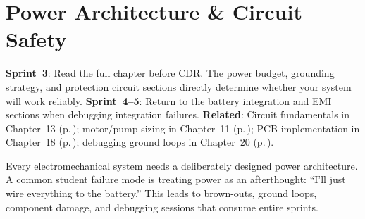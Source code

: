 \chapter{Power Architecture \& Circuit Safety}\label{ch:power}

\begin{tipbox}
\textbf{Sprint~3}: Read the full chapter before CDR. The power budget, grounding strategy, and protection circuit sections directly determine whether your system will work reliably. \textbf{Sprint~4--5}: Return to the battery integration and EMI sections when debugging integration failures. \textbf{Related}: Circuit fundamentals in Chapter~13 (p.\,\pageref{ch:electronics}); motor/pump sizing in Chapter~11 (p.\,\pageref{ch:motors}); PCB implementation in Chapter~18 (p.\,\pageref{ch:pcb}); debugging ground loops in Chapter~20 (p.\,\pageref{ch:debug}).
\end{tipbox}

\vspace{1em}

Every electromechanical system needs a deliberately designed power architecture. A common student failure mode is treating power as an afterthought: ``I'll just wire everything to the battery.'' This leads to brown-outs, ground loops, component damage, and debugging sessions that consume entire sprints.

